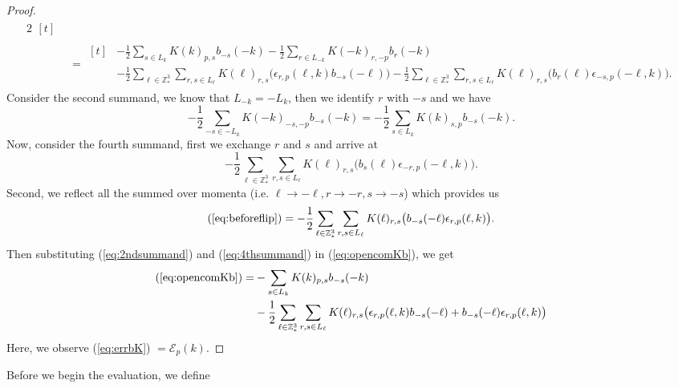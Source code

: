 \documentclass[sn-mathphys,Numbered, a4paper ,nocrop]{sn-jnl}%
\newcommand{\half}{\frac{1}{2}}
\theoremstyle{plain}
\theoremstyle{definition}
\theoremstyle{remark}
\theoremstyle{plain}
\theoremstyle{definition}
\theoremstyle{remark}
\begin{document}
\begin{proof}
\begin{alignat}{2}
\begin{aligned}[t]
      \end{aligned}\nonumber\\
      &=\begin{aligned}[t]
          &-\half\sum\limits_{s\in L_k}K(k)_{p,s}b_{-s}(-k) - \half\sum\limits_{r\in L_{-k}}K(-k)_{r,-p}b_{r}(-k) \\
      &- \half\sum\limits_{\ell\in \mathbb{Z}^3_*}\sum\limits_{r,s\in L_\ell}K(\ell)_{r,s}\big(\epsilon_{r,p}(\ell,k)b_{-s}(-\ell)\big) - \half\sum\limits_{\ell\in \mathbb{Z}^3_*}\sum\limits_{r,s\in L_\ell}K(\ell)_{r,s}\big(b_{r}(\ell)\epsilon_{-s,p}(-\ell,k)\big).\label{eq:opencomKb}
      \end{aligned}
   \end{alignat}
   Consider the second summand, we know that $L_{-k}=-L_k$,
   then we identify $r$ with $-s$ and we have
   \begin{equation}\label{eq:2ndsummand}
        - \half\sum\limits_{-s\in -L_{k}}K(-k)_{-s,-p}b_{-s}(-k) =- \half\sum\limits_{s\in L_{k}}K(k)_{s,p}b_{-s}(-k) .
   \end{equation}
   Now, consider the fourth summand, first we exchange $r$ and $s$ and arrive at
   \begin{equation}\label{eq:beforeflip}
       - \half\sum\limits_{\ell\in \mathbb{Z}^3_*}\sum\limits_{r,s\in L_\ell}K(\ell)_{r,s}\big(b_{s}(\ell)\epsilon_{-r,p}(-\ell,k)\big).
   \end{equation}
   Second, we reflect all the summed over momenta (i.e. $\ell\rightarrow-\ell, r\rightarrow-r, s\rightarrow-s$) which provides us
   \begin{equation}\label{eq:4thsummand}
       (\ref{eq:beforeflip}) = - \half\sum\limits_{\ell\in \mathbb{Z}^3_*}\sum\limits_{r,s\in L_\ell}K(\ell)_{r,s}\big(b_{-s}(-\ell)\epsilon_{r,p}(\ell,k)\big).
   \end{equation}
   Then substituting (\ref{eq:2ndsummand}) and (\ref{eq:4thsummand}) in (\ref{eq:opencomKb}), we get
   \begin{align}
       (\ref{eq:opencomKb})=&-\sum\limits_{s\in L_k}K(k)_{p,s}b_{-s}(-k)  \\
      &- \half\sum\limits_{\ell\in \mathbb{Z}^3_*}\sum\limits_{r,s\in L_\ell}K(\ell)_{r,s}\big(\epsilon_{r,p}(\ell,k)b_{-s}(-\ell)+b_{-s}(-\ell)\epsilon_{r,p}(\ell,k)\big)\label{eq:errbK}
   \end{align}
   Here, we observe (\ref{eq:errbK}) $=  \mathcal{E}_{p}(k) $.
\end{proof}
Before we begin the evaluation, we define
\end{document}
